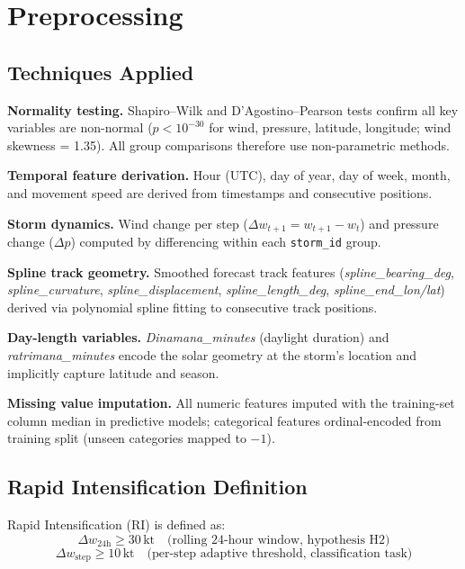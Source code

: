 \documentclass[12pt,a4paper]{article}
\begin{document}
\section{Preprocessing}
\label{sec:preprocessing}

\subsection{Techniques Applied}

\textbf{Normality testing.} Shapiro--Wilk and D'Agostino--Pearson tests
confirm all key variables are non-normal ($p < 10^{-30}$ for wind, pressure,
latitude, longitude; wind skewness = 1.35). All group comparisons therefore
use non-parametric methods.

\textbf{Temporal feature derivation.} Hour (UTC), day of year, day of week,
month, and movement speed are derived from timestamps and consecutive positions.

\textbf{Storm dynamics.} Wind change per step ($\Delta w_{t+1} = w_{t+1} - w_t$)
and pressure change ($\Delta p$) computed by differencing within each
\texttt{storm\_id} group.

\textbf{Spline track geometry.} Smoothed forecast track features
(\textit{spline\_bearing\_deg},\\ \textit{spline\_curvature}, \textit{spline\_displacement},
\textit{spline\_length\_deg}, \textit{spline\_end\_lon/lat}) derived via
polynomial spline fitting to consecutive track positions.

\textbf{Day-length variables.} \textit{Dinamana\_minutes} (daylight duration)
and \textit{ratrimana\_minutes} encode the solar geometry at the storm's
location and implicitly capture latitude and season.

\textbf{Missing value imputation.} All numeric features imputed with the
training-set column median in predictive models; categorical features
ordinal-encoded from training split (unseen categories mapped to $-1$).

\subsection{Rapid Intensification Definition}

Rapid Intensification (RI) is defined as:
\begin{equation}
  \Delta w_{\text{24h}} \geq 30\,\text{kt} \quad \text{(rolling 24-hour window, hypothesis H2)}
\end{equation}
\begin{equation}
  \Delta w_{\text{step}} \geq 10\,\text{kt} \quad \text{(per-step adaptive threshold, classification task)}
\end{equation}
\end{document}

